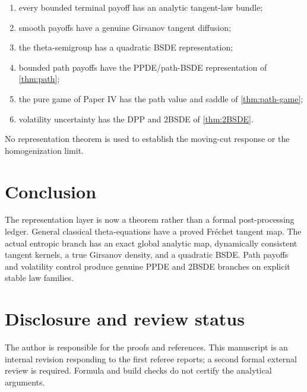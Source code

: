 \documentclass[11pt,reqno]{amsart}
\theoremstyle{definition}
\theoremstyle{remark}
\begin{document}
\begin{enumerate}[label=(\roman*)]
\item every bounded terminal payoff has an analytic tangent-law bundle;
\item smooth payoffs have a genuine Girsanov tangent diffusion;
\item the theta-semigroup has a quadratic BSDE representation;
\item bounded path payoffs have the PPDE/path-BSDE representation of
\cref{thm:path};
\item the pure game of Paper IV has the path value and saddle of
\cref{thm:path-game};
\item volatility uncertainty has the DPP and 2BSDE of \cref{thm:2BSDE}.
\end{enumerate}

No representation theorem is used to establish the moving-cut response or the
homogenization limit.

\section{Conclusion}

The representation layer is now a theorem rather than a formal
post-processing ledger.  General classical theta-equations have a proved
Fr\'echet tangent map.  The actual entropic branch has an exact global analytic
map, dynamically consistent tangent kernels, a true Girsanov density, and a
quadratic BSDE.  Path payoffs and volatility control produce genuine PPDE and
2BSDE branches on explicit stable law families.

\section*{Disclosure and review status}
The author is responsible for the proofs and references.  This manuscript is
an internal revision responding to the first referee reports; a second formal
external review is required.  Formula and build checks do not certify the
analytical arguments.



\end{document}

